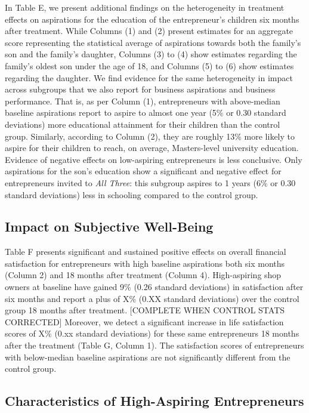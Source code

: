\documentclass[11.5pt]{article}
\begin{document}
In Table E, we present additional findings on the heterogeneity in treatment effects on aspirations for the education of the entrepreneur's children six months after treatment. While Columns (1) and (2) present estimates for an aggregate score representing the statistical average of aspirations towards both the family's son and the family's daughter, Columns (3) to (4) show estimates regarding the family's oldest son under the age of 18, and Columns (5) to (6) show estimates regarding the daughter. We find evidence for the same heterogeneity in impact across subgroups that we also report for business aspirations and business performance. That is, as per Column (1), entrepreneurs with above-median baseline aspirations report to aspire to almost one year (5\% or 0.30 standard deviations) more educational attainment for their children than the control group. Similarly, according to Column (2), they are roughly 13\% more likely to aspire for their children to reach, on average, Masters-level university education. Evidence of negative effects on low-aspiring entrepreneurs is less conclusive. Only aspirations for the son's education show a significant and negative effect for entrepreneurs invited to \emph{All Three}: this subgroup aspires to 1 years (6\% or 0.30 standard deviations) less in schooling compared to the control group.

\subsection{Impact on Subjective Well-Being}

Table F presents significant and sustained positive effects on overall financial satisfaction for entrepreneurs with high baseline aspirations both six months (Column 2) and 18 months after treatment (Column 4). High-aspiring shop owners at baseline have gained 9\% (0.26 standard deviations) in satisfaction after six months and report a plus of X\% (0.XX standard deviations) over the control group 18 months after treatment. [COMPLETE WHEN CONTROL STATS CORRECTED] Moreover, we detect a significant increase in life satisfaction scores of X\% (0.xx standard deviations) for these same entrepreneurs 18 months after the treatment (Table G, Column 1). The satisfaction scores of entrepreneurs with below-median baseline aspirations are not significantly different from the control group.

\subsection{Characteristics of High-Aspiring Entrepreneurs}
\end{document}

